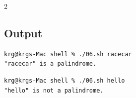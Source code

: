 \documentclass[a4paper,12pt]{article}
\begin{document}
\begin{multicols}{2}
\subsection*{Output}
\begin{lstlisting}[style=outputstyle]
krg@krgs-Mac shell % ./06.sh racecar
"racecar" is a palindrome.
\end{lstlisting}
\begin{lstlisting}[style=outputstyle]
krg@krgs-Mac shell % ./06.sh hello
"hello" is not a palindrome.
\end{lstlisting}

\end{multicols}
\newpage

\end{document}
